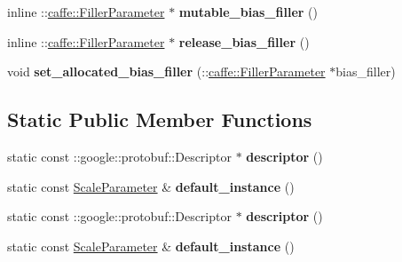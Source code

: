 \begin{DoxyCompactItemize}
inline \+::\mbox{\hyperlink{classcaffe_1_1_filler_parameter}{caffe\+::\+Filler\+Parameter}} $\ast$ {\bfseries mutable\+\_\+bias\+\_\+filler} ()
\item 
\mbox{\label{classcaffe_1_1_scale_parameter_add8e7c1b46c600d7b89bb270279eed9e}} 
inline \+::\mbox{\hyperlink{classcaffe_1_1_filler_parameter}{caffe\+::\+Filler\+Parameter}} $\ast$ {\bfseries release\+\_\+bias\+\_\+filler} ()
\item 
\mbox{\label{classcaffe_1_1_scale_parameter_a76e6a06495ea374bdde2fb5337fb6940}} 
void {\bfseries set\+\_\+allocated\+\_\+bias\+\_\+filler} (\+::\mbox{\hyperlink{classcaffe_1_1_filler_parameter}{caffe\+::\+Filler\+Parameter}} $\ast$bias\+\_\+filler)
\end{DoxyCompactItemize}
\subsection*{Static Public Member Functions}
\begin{DoxyCompactItemize}
\item 
\mbox{\label{classcaffe_1_1_scale_parameter_a299ceffa3172e410ff4ad00b4815e651}} 
static const \+::google\+::protobuf\+::\+Descriptor $\ast$ {\bfseries descriptor} ()
\item 
\mbox{\label{classcaffe_1_1_scale_parameter_a2cd7c04f570a544949a63649b266be7c}} 
static const \mbox{\hyperlink{classcaffe_1_1_scale_parameter}{Scale\+Parameter}} \& {\bfseries default\+\_\+instance} ()
\item 
\mbox{\label{classcaffe_1_1_scale_parameter_ad8d7569026ebde2a6dc77298741e5ed9}} 
static const \+::google\+::protobuf\+::\+Descriptor $\ast$ {\bfseries descriptor} ()
\item 
\mbox{\label{classcaffe_1_1_scale_parameter_a9158d0998ea634ec507ab9cf1717f59e}} 
static const \mbox{\hyperlink{classcaffe_1_1_scale_parameter}{Scale\+Parameter}} \& {\bfseries default\+\_\+instance} ()
\end{DoxyCompactItemize}
